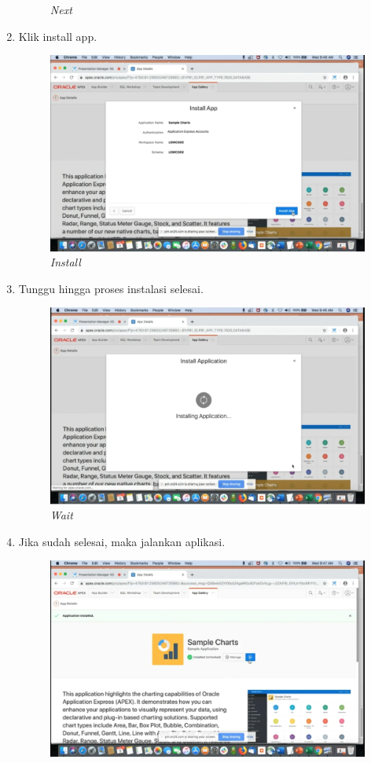 \begin{enumerate}
\begin{figure}[H]
    \caption{\textit{Next}}
    \label{foto5}
\end{figure}
 \item Klik install app.
 \begin{figure}[H]
    \centering
    \includegraphics[scale=0.5]{figures/f}
    \caption{\textit{Install}}
    \label{foto6}
\end{figure}
 \item Tunggu hingga proses instalasi selesai.
 \begin{figure}[H]
    \centering
    \includegraphics[scale=0.5]{figures/g}
    \caption{\textit{Wait}}
    \label{foto7}
\end{figure}
 \item Jika sudah selesai, maka jalankan aplikasi.
 \begin{figure}[H]
    \centering
    \includegraphics[scale=0.5]{figures/h}

\end{figure}
\end{enumerate}

